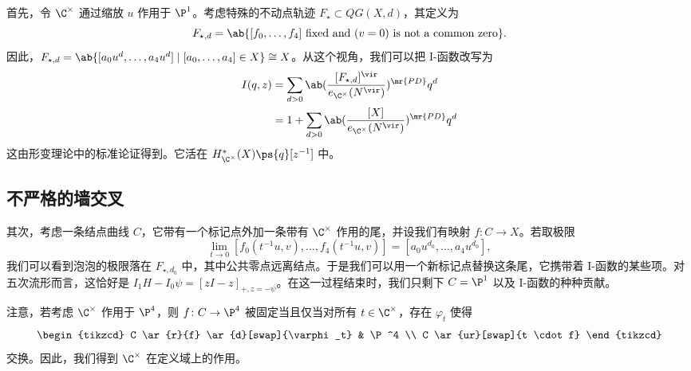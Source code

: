 首先，令 \(\C^{\times}\) 通过缩放 \(u\) 作用于 \(\P^1\)。考虑特殊的不动点轨迹 \(F_{\star} \subset QG(X, d)\)，其定义为
\[ F_{\star,d} = \ab\{ [f_0, \ldots, f_4] \text{ fixed and } (v=0) \text{ is not a common zero} \}. \]
因此，\(F_{\star,d} = \ab\{ [a_0 u^d, \ldots, a_4 u^d] \mid [a_0, \ldots, a_4] \in X \} \cong X\)。从这个视角，我们可以把 I-函数改写为
\begin{align*}
    I(q,z) &= \sum_{d > 0} \ab(\frac{[F_{\star, d}]^{\vir}}{e_{\C^{\times}}(N^{\vir})})^{\mr{PD}} q^d \\
    &= 1 + \sum_{d > 0} \ab( \frac{[X]}{e_{\C^{\times}}(N^{\vir})})^{\mr{PD}} q^d
\end{align*}
这由形变理论中的标准论证得到。它活在 \(H^*_{\C^{\times}}(X) \ps{q}[z^{-1}]\) 中。

\subsection{不严格的墙交叉}%
\label{sub:Wall-crossing without rigor}


其次，考虑一条结点曲线 \(C\)，它带有一个标记点外加一条带有 \(\C^{\times}\) 作用的尾，并设我们有映射 \(f \colon C \to X\)。若取极限
\[ \lim_{t \to 0} [f_0(t^{-1}u, v), \ldots, f_4(t^{-1}u, v)] = [a_0 u^{d_0}, \ldots, a_4 u^{d_0}], \]
我们可以看到泡泡的极限落在 \(F_{\star, d_0}\) 中，其中公共零点远离结点。于是我们可以用一个新标记点替换这条尾，它携带着 I-函数的某些项。对五次流形而言，这恰好是 \(I_1 H - I_0 \psi = [zI-z]_{+, z = -\psi}\)。在这一过程结束时，我们只剩下 \(C = \P^1\) 以及 I-函数的种种贡献。

注意，若考虑 \(\C^{\times}\) 作用于 \(\P^4\)，则 \(f \colon C \to \P^4\) 被固定当且仅当对所有 \(t \in \C^{\times}\)，存在 \(\varphi_t\) 使得
\begin{equation*}
\begin{tikzcd}
    C \ar{r}{f} \ar{d}[swap]{\varphi_t} & \P^4 \\
    C \ar{ur}[swap]{t \cdot f}
\end{tikzcd}
\end{equation*}
交换。因此，我们得到 \(\C^{\times}\) 在定义域上的作用。

